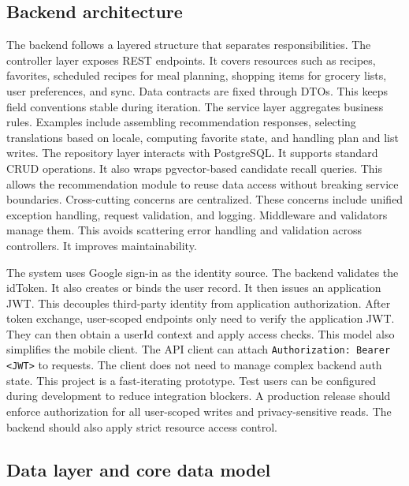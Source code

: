 \documentclass[journal]{IEEEtran}
\begin{document}
\subsection{Backend architecture}

The backend follows a layered structure that separates responsibilities. The controller layer exposes REST endpoints. It covers resources such as recipes, favorites, scheduled recipes for meal planning, shopping items for grocery lists, user preferences, and sync. Data contracts are fixed through DTOs. This keeps field conventions stable during iteration. The service layer aggregates business rules. Examples include assembling recommendation responses, selecting translations based on locale, computing favorite state, and handling plan and list writes. The repository layer interacts with PostgreSQL. It supports standard CRUD operations. It also wraps pgvector-based candidate recall queries. This allows the recommendation module to reuse data access without breaking service boundaries. Cross-cutting concerns are centralized. These concerns include unified exception handling, request validation, and logging. Middleware and validators manage them. This avoids scattering error handling and validation across controllers. It improves maintainability.

The system uses Google sign-in as the identity source. The backend validates the idToken. It also creates or binds the user record. It then issues an application JWT. This decouples third-party identity from application authorization. After token exchange, user-scoped endpoints only need to verify the application JWT. They can then obtain a userId context and apply access checks. This model also simplifies the mobile client. The API client can attach \texttt{Authorization: Bearer \textless JWT\textgreater} to requests. The client does not need to manage complex backend auth state. This project is a fast-iterating prototype. Test users can be configured during development to reduce integration blockers. A production release should enforce authorization for all user-scoped writes and privacy-sensitive reads. The backend should also apply strict resource access control.

\subsection{Data layer and core data model}
\end{document}
